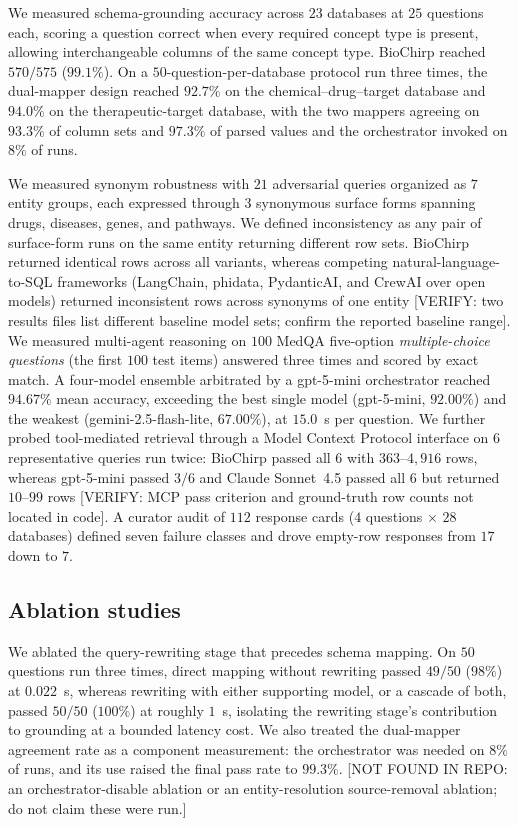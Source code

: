We measured schema-grounding accuracy across $23$ databases at $25$ questions each, scoring a question correct when every required concept type is present, allowing interchangeable columns of the same concept type. BioChirp reached $570/575$ ($99.1\%$). On a $50$-question-per-database protocol run three times, the dual-mapper design reached $92.7\%$ on the chemical--drug--target database and $94.0\%$ on the therapeutic-target database, with the two mappers agreeing on $93.3\%$ of column sets and $97.3\%$ of parsed values and the orchestrator invoked on $8\%$ of runs.

We measured synonym robustness with $21$ adversarial queries organized as $7$ entity groups, each expressed through $3$ synonymous surface forms spanning drugs, diseases, genes, and pathways. We defined inconsistency as any pair of surface-form runs on the same entity returning different row sets. BioChirp returned identical rows across all variants, whereas competing natural-language-to-SQL frameworks (LangChain, phidata, PydanticAI, and CrewAI over open models) returned inconsistent rows across synonyms of one entity [VERIFY: two results files list different baseline model sets; confirm the reported baseline range]. We measured multi-agent reasoning on $100$ MedQA five-option \textit{multiple-choice questions} (the first $100$ test items) answered three times and scored by exact match. A four-model ensemble arbitrated by a gpt-5-mini orchestrator reached $94.67\%$ mean accuracy, exceeding the best single model (gpt-5-mini, $92.00\%$) and the weakest (gemini-2.5-flash-lite, $67.00\%$), at $15.0$~s per question. We further probed tool-mediated retrieval through a Model Context Protocol interface on $6$ representative queries run twice: BioChirp passed all $6$ with $363$--$4{,}916$ rows, whereas gpt-5-mini passed $3/6$ and Claude Sonnet~4.5 passed all $6$ but returned $10$--$99$ rows [VERIFY: MCP pass criterion and ground-truth row counts not located in code]. A curator audit of $112$ response cards ($4$ questions $\times$ $28$ databases) defined seven failure classes and drove empty-row responses from $17$ down to $7$.

\subsection*{Ablation studies}

We ablated the query-rewriting stage that precedes schema mapping. On $50$ questions run three times, direct mapping without rewriting passed $49/50$ ($98\%$) at $0.022$~s, whereas rewriting with either supporting model, or a cascade of both, passed $50/50$ ($100\%$) at roughly $1$~s, isolating the rewriting stage's contribution to grounding at a bounded latency cost. We also treated the dual-mapper agreement rate as a component measurement: the orchestrator was needed on $8\%$ of runs, and its use raised the final pass rate to $99.3\%$. [NOT FOUND IN REPO: an orchestrator-disable ablation or an entity-resolution source-removal ablation; do not claim these were run.]

